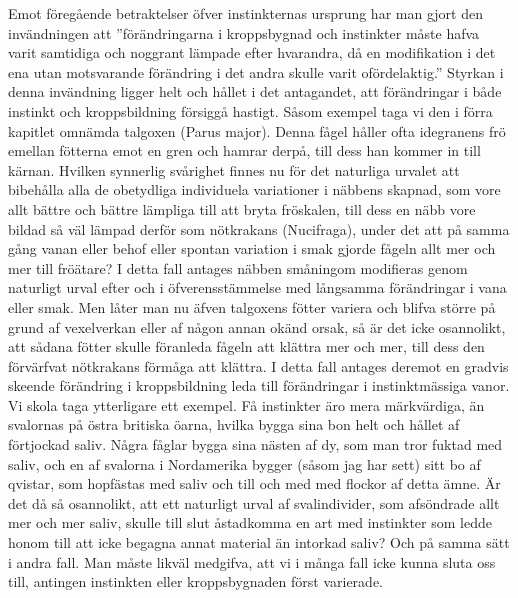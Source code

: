 Emot föregående betraktelser öfver instinkternas ursprung har man gjort den invändningen att ”förändringarna i kroppsbygnad och instinkter måste hafva varit samtidiga och noggrant lämpade efter hvarandra, då en modifikation i det ena utan motsvarande förändring i det andra skulle varit ofördelaktig.” Styrkan i denna invändning ligger helt och hållet i det antagandet, att förändringar i både instinkt och kroppsbildning försiggå hastigt. Såsom exempel taga vi den i förra kapitlet omnämda talgoxen (Parus major). Denna fågel håller ofta idegranens frö emellan fötterna emot en gren och hamrar derpå, till dess han kommer in till kärnan. Hvilken synnerlig svårighet finnes nu för det naturliga urvalet att bibehålla alla de obetydliga individuela variationer i näbbens skapnad, som vore allt bättre och bättre lämpliga till att bryta fröskalen, till dess en näbb vore bildad så väl lämpad derför som nötkrakans (Nucifraga), under det att på samma gång vanan eller behof eller spontan variation i smak gjorde fågeln allt mer och mer till fröätare? I detta fall antages näbben småningom modifieras genom naturligt urval efter och i öfverensstämmelse med långsamma förändringar i vana eller smak. Men låter man nu äfven talgoxens fötter variera och blifva större på grund af vexelverkan eller af någon annan okänd orsak, så är det icke osannolikt, att sådana fötter skulle föranleda fågeln att klättra mer och mer, till dess den förvärfvat nötkrakans förmåga att klättra. I detta fall antages deremot en gradvis skeende förändring i kroppsbildning leda till förändringar i instinktmässiga vanor. Vi skola taga ytterligare ett exempel. Få instinkter äro mera märkvärdiga, än svalornas på östra britiska öarna, hvilka bygga sina bon helt och hållet af förtjockad saliv. Några fåglar bygga sina nästen af dy, som man tror fuktad med saliv, och en af svalorna i Nordamerika bygger (såsom jag har sett) sitt bo af qvistar, som hopfästas med saliv och till och med med flockor af detta ämne. Är det då så osannolikt, att ett naturligt urval af svalindivider, som afsöndrade allt mer och mer saliv, skulle till slut åstadkomma en art med instinkter som ledde honom till att icke begagna annat material än intorkad saliv? Och på samma sätt i andra fall. Man måste likväl medgifva, att vi i många fall icke kunna sluta oss till, antingen instinkten eller kroppsbygnaden först varierade.

